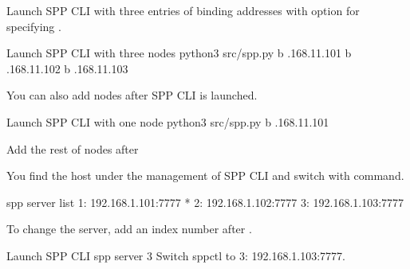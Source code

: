 \documentclass[a4paper,11pt,openany,oneside,english]{sphinxmanual}
\begin{document}
Launch SPP CLI with three entries of binding addresses with  option
for specifying .

\begin{sphinxVerbatim}[commandchars=\\\{\},formatcom=\footnotesize]
 Launch SPP CLI with three nodes
 python3 src/spp.py \PYGZhy{}b .168.11.101 
    \PYGZhy{}b .168.11.102 
    \PYGZhy{}b .168.11.103 
\end{sphinxVerbatim}

You can also add nodes after SPP CLI is launched.

\begin{sphinxVerbatim}[commandchars=\\\{\},formatcom=\footnotesize]
 Launch SPP CLI with one node
 python3 src/spp.py \PYGZhy{}b .168.11.101

 Add the rest of nodes after
\end{sphinxVerbatim}

You find the host under the management of SPP CLI and switch with
 command.

\begin{sphinxVerbatim}[commandchars=\\\{\},formatcom=\footnotesize]
spp \PYGZgt{} server list
  1: 192.168.1.101:7777 *
  2: 192.168.1.102:7777
  3: 192.168.1.103:7777
\end{sphinxVerbatim}

To change the server, add an index number after .

\begin{sphinxVerbatim}[commandchars=\\\{\},formatcom=\footnotesize]
\PYGZsh{} Launch SPP CLI
spp \PYGZgt{} server 3
Switch spp\PYGZhy{}ctl to \PYGZdq{}3: 192.168.1.103:7777\PYGZdq{}.
\end{sphinxVerbatim}
\end{document}
